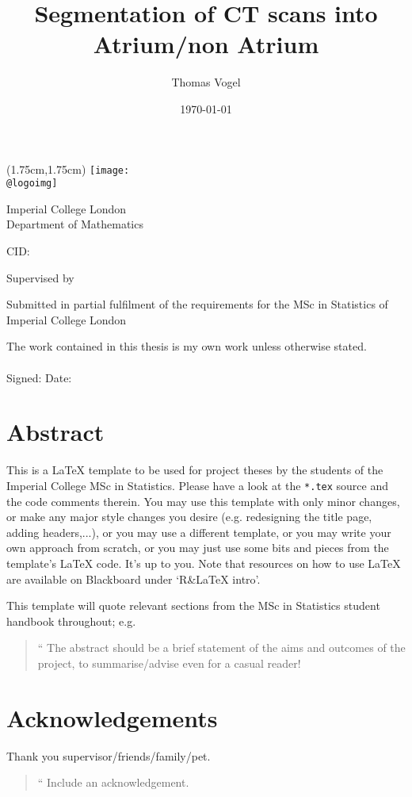 \documentclass[11pt,a4,twosided,singlespacing,titlepagenumber=on]{scrreprt}
\title{Segmentation of CT scans into Atrium/non Atrium}
\author{Thomas Vogel}
\date{\today}
\makeatletter
\numberwithin{equation}{chapter} %
\renewcommand{\maketitle}{
\begin{titlepage}
\ifdefined\@logoimg
\begin{textblock*}{8cm}(1.75cm,1.75cm)
\texttt{[image: \\@logoimg]}
\end{textblock*}
\vspace*{1cm}
\else
\fi
\begin{center}
\vspace*{\stretch{0.1}}
Imperial College London\\
Department of Mathematics\par
\vspace*{\stretch{1}} %
{\titlefont\Huge \@title\par} %
\vspace*{\stretch{2}}
{\Large \@author \par}
\vspace*{1em}
{\large CID: \@CID \par}
\vspace*{\stretch{0.5}}
{\large Supervised by \@supervisor \par}
\vspace*{\stretch{3}}
{\Large \@date \par}
\vspace*{\stretch{1}}
{\large Submitted in partial fulfilment of the requirements for the
MSc in Statistics of Imperial College London}
\vspace*{\stretch{0.1}}
\end{center}%
\end{titlepage}%
}
\newcommand*{\declaration}{%
\vspace*{0.3\textheight}
The work contained in this thesis is my own work unless
otherwise stated.\\
\vspace*{0.1\textheight}\\
\hspace*{0.25\textwidth}Signed: \hspace{0.25\textwidth} Date:
\clearpage}
\renewenvironment{abstract}%
{\chapter*{Abstract}\thispagestyle{plain}}%
{\clearpage}
\newenvironment{myquote}%
{\begin{quote}{\Large{}``}}%
{\ifhmode\unskip\fi{\Large{}''}\end{quote}}
\makeatother
\begin{document}
\maketitle %

\declaration %

\begin{abstract}
This is a \LaTeX{} template to be used for project theses by the students of the Imperial College MSc in Statistics. Please have a look at the \verb|*.tex| source and the code comments therein. You may use this template with only minor changes, or make any major style changes you desire (e.g. redesigning the title page, adding headers,...), or you may use a different template, or you may write your own approach from scratch, or you may just use some bits and pieces from the template's \LaTeX{} code. It's up to you. Note that resources on how to use \LaTeX{} are available on Blackboard under `R\&{}LaTeX intro'.

This template will quote relevant sections from the MSc in Statistics student handbook throughout; e.g.
\begin{myquote}
The abstract should be a brief statement of the aims and outcomes of the project, to summarise/advise
even for a casual reader!
\end{myquote}
\end{abstract}
\newpage
\chapter*{Acknowledgements}
Thank you supervisor/friends/family/pet.
\begin{myquote}
Include an acknowledgement.
\end{myquote}
\newpage

\renewcommand{\contentsname}{Table of Contents}
\tableofcontents
\newpage






%

\cleardoublepage
{}
{} %




\cleardoublepage 


\end{document}
